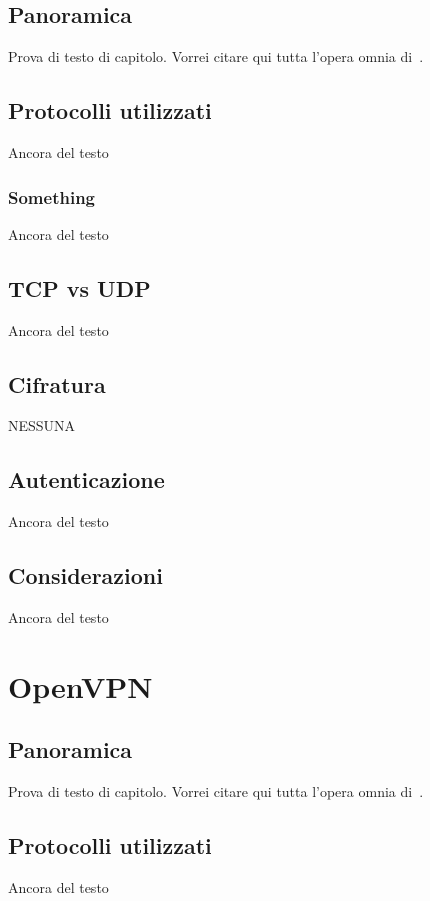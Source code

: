 \subsection{Panoramica}
Prova di testo di capitolo. Vorrei citare qui tutta l'opera omnia di~\cite{IEEE:1990,WIKI:INTEROP,BOX:1997,AHL:1996}.

\subsection{Protocolli utilizzati}
Ancora del testo

\subsubsection{Something}
Ancora del testo

\subsection{TCP vs UDP}
Ancora del testo

\subsection{Cifratura}
NESSUNA

\subsection{Autenticazione}
Ancora del testo

\subsection{Considerazioni}
Ancora del testo

\section{OpenVPN}
\subsection{Panoramica}
Prova di testo di capitolo. Vorrei citare qui tutta l'opera omnia di~\cite{IEEE:1990,WIKI:INTEROP,BOX:1997,AHL:1996}.

\subsection{Protocolli utilizzati}
Ancora del testo


